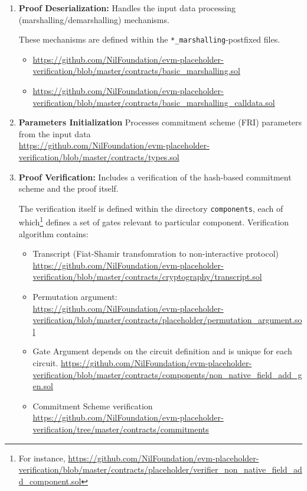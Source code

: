 \begin{enumerate}
    \item \textbf{Proof Deserialization:} Handles the input data processing (marshalling/demarshalling) mechanisms.

    These mechanisms are defined within the \texttt{*\_marshalling}-postfixed files.
    \begin{itemize}
        \item \url{https://github.com/NilFoundation/evm-placeholder-verification/blob/master/contracts/basic_marshalling.sol}
        \item \url{https://github.com/NilFoundation/evm-placeholder-verification/blob/master/contracts/basic_marshalling_calldata.sol}
    \end{itemize}

    \item \textbf{Parameters Initialization} Processes commitment scheme (FRI) parameters from the input data \\
            \url{https://github.com/NilFoundation/evm-placeholder-verification/blob/master/contracts/types.sol}
    \item \textbf{Proof Verification:} Includes a verification of the hash-based commitment scheme and the proof itself.

    The verification itself is defined within the directory \texttt{components}, each of which\footnote{
        For instance, \url{https://github.com/NilFoundation/evm-placeholder-verification/blob/master/contracts/placeholder/verifier_non_native_field_add_component.sol}
    } defines a set of gates
    relevant to particular component.
    Verification algorithm contains:
    \begin{itemize}
        \item Transcript (Fiat-Shamir transfomration to non-interactive protocol) \\
            \url{https://github.com/NilFoundation/evm-placeholder-verification/blob/master/contracts/cryptography/transcript.sol}
        \item Permutation argument: \\
            \url{https://github.com/NilFoundation/evm-placeholder-verification/blob/master/contracts/placeholder/permutation_argument.sol}
        \item Gate Argument depends on the circuit definition and is unique for each circuit.
                    \url{https://github.com/NilFoundation/evm-placeholder-verification/blob/master/contracts/components/non_native_field_add_gen.sol} 
        \item Commitment Scheme verification \\
            \url{https://github.com/NilFoundation/evm-placeholder-verification/tree/master/contracts/commitments}
    \end{itemize}
\end{enumerate}

